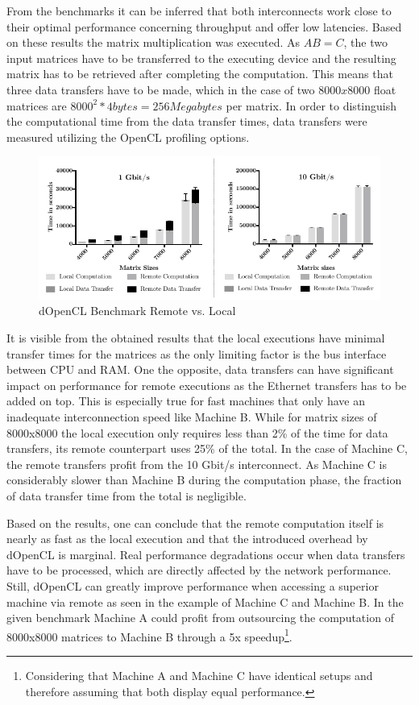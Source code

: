 From the benchmarks it can be inferred that both interconnects work close to their optimal performance concerning throughput and offer low latencies. Based on these results the matrix multiplication was executed. As $AB = C$, the two input matrices have to be transferred to the executing device and the resulting matrix has to be retrieved after completing the computation. This means that three data transfers have to be made, which in the case of two $8000x8000$ float matrices are $8000^2 * 4 bytes = 256 Megabytes$ per matrix. In order to distinguish the computational time from the data transfer times, data transfers were measured utilizing the OpenCL profiling options.

\begin{figure}[H]

\includegraphics[width=1.0\textwidth]{images/data_transfer.pdf}
\centering
\caption{dOpenCL Benchmark Remote vs. Local}
\label{img:data_transfer}
\end{figure}

It is visible from the obtained results that the local executions have minimal transfer times for the matrices as the only limiting factor is the bus interface between CPU and RAM. One the opposite, data transfers can have significant impact on performance for remote executions as the Ethernet transfers has to be added on top. This is especially true for fast machines that only have an inadequate interconnection speed like Machine B. While for matrix sizes of 8000x8000 the local execution only requires less than 2\% of the time for data transfers, its remote counterpart uses 25\% of the total. In the case of Machine C, the remote transfers profit from the 10 Gbit/s interconnect. As Machine C is considerably slower than Machine B during the computation phase, the fraction of data transfer time from the total is negligible.

Based on the results, one can conclude that the remote computation itself is nearly as fast as the local execution and that the introduced overhead by dOpenCL is marginal. Real performance degradations occur when data transfers have to be processed, which are directly affected by the network performance. Still, dOpenCL can greatly improve performance when accessing a superior machine via remote as seen in the example of Machine C and Machine B. In the given benchmark Machine A could profit from outsourcing the computation of 8000x8000 matrices to Machine B through a 5x speedup\footnote{Considering that Machine A and Machine C have identical setups and therefore assuming that both display equal performance.}.

